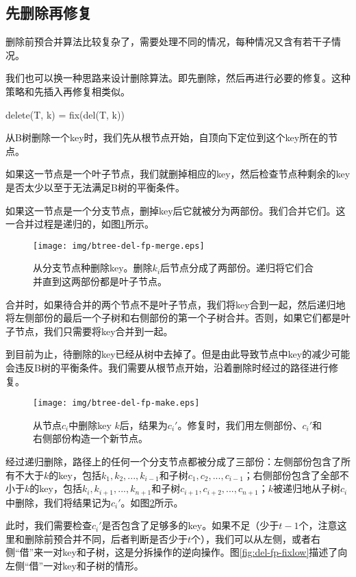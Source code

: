 \documentclass[UTF8]{article}
\begin{document}
\subsection{先删除再修复}

删除前预合并算法比较复杂了，需要处理不同的情况，每种情况又含有若干子情况。

我们也可以换一种思路来设计删除算法。即先删除，然后再进行必要的修复。这种策略和先插入再修复相类似。

\be
delete(T, k) = fix(del(T, k))
\ee

从B树删除一个key时，我们先从根节点开始，自顶向下定位到这个key所在的节点。

如果这一节点是一个叶子节点，我们就删掉相应的key，然后检查节点种剩余的key是否太少以至于无法满足B树的平衡条件。

如果这一节点是一个分支节点，删掉key后它就被分为两部份。我们合并它们。这一合并过程是递归的，如图\ref{fig:del-fp-merge}所示。

\begin{figure}[htbp]
  \centering
  \texttt{[image: img/btree-del-fp-merge.eps]}
  \caption{从分支节点种删除key。删除$k_i$后节点分成了两部份。递归将它们合并直到这两部份都是叶子节点。} \label{fig:del-fp-merge}
\end{figure}

合并时，如果待合并的两个节点不是叶子节点，我们将key合到一起，然后递归地将左侧部份的最后一个子树和右侧部份的第一个子树合并。否则，如果它们都是叶子节点，我们只需要将key合并到一起。

到目前为止，待删除的key已经从树中去掉了。但是由此导致节点中key的减少可能会违反B树的平衡条件。我们需要从根节点开始，沿着删除时经过的路径进行修复。

\begin{figure}[htbp]
  \centering
  \texttt{[image: img/btree-del-fp-make.eps]}
  \caption{从节点$c_i$中删除key $k$后，结果为$c_i'$。修复时，我们用左侧部份、$c_i'$和右侧部份构造一个新节点。}
  \label{fig:del-fp-make}
\end{figure}

经过递归删除，路径上的任何一个分支节点都被分成了三部份：左侧部份包含了所有不大于$k$的key，包括$k_1, k_2, ..., k_{i-1}$和子树$c_1, c_2, ..., c_{i-1}$；右侧部份包含了全部不小于$k$的key，包括$k_i, k_{i+1}, ..., k_{n+1}$和子树$c_{i+1}, c_{i+2}, ..., c_{n+1}$；$k$被递归地从子树$c_i$中删除，我们将结果记为$c_i'$。如图\ref{fig:del-fp-make}所示。

此时，我们需要检查$c_i'$是否包含了足够多的key。如果不足（少于$t-1$个，注意这里和删除前预合并不同，后者判断是否少于$t$个），我们可以从左侧，或者右侧“借”来一对key和子树，这是分拆操作的逆向操作。图\ref{fig:del-fp-fixlow}描述了向左侧“借”一对key和子树的情形。
\end{document}
